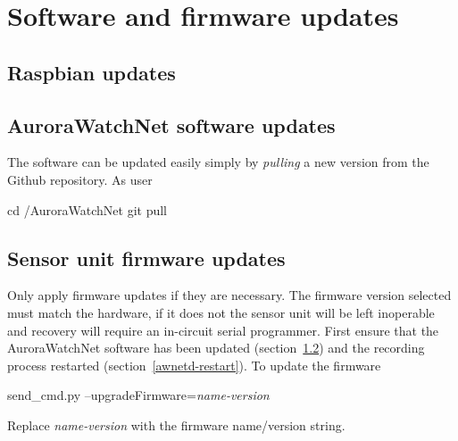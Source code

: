 \chapter{Software and firmware updates}

\section{Raspbian updates}

\section{AuroraWatchNet software updates}
\label{awn-software-updates}

The software can be updated easily simply by \emph{pulling} a new
version from the Github repository. As user \piUser
\begin{Cmd}
cd \mytilde/AuroraWatchNet
git pull
\end{Cmd}

\section{Sensor unit firmware updates}
Only apply firmware updates if they are necessary. The firmware
version selected must match the hardware, if it does not the sensor
unit will be left inoperable and recovery will require an in-circuit
serial programmer. First ensure that the AuroraWatchNet software has
been updated (section~\ref{awn-software-updates}) and the recording
process restarted (section~\ref{awnetd-restart}). To update the
firmware
\begin{Cmd}
send_cmd.py --upgradeFirmware=\textsl{name-version}
\end{Cmd}
Replace \textsl{name-version} with the firmware name\slash version
string.
